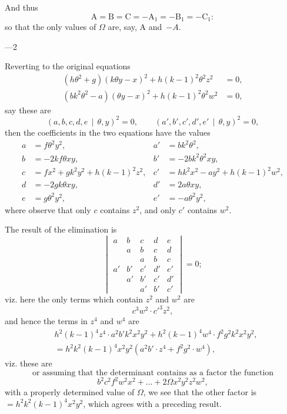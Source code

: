 \documentclass[12pt,a4paper]{article}
\theoremstyle{plain}
\begin{document}
And thus
\[
\text{A} = \text{B} = \text{C} = -\text{A}_{1} = -\text{B}_{1} = -\text{C}_{1}:
\]
so that the only values of $\Omega$ are, say, A and~$-A$.

\medskip{}---2

\newpage
\setcounter{page}{112}

Reverting to the original equations
\begin{align*}
(h\theta^{2} + g)(k\theta y - x)^{2} + h(k-1)^{2}\theta^{2}z^{2} &= 0, \\
(bk^{2}\theta^{2} - a)(\theta y - x)^{2} + h(k-1)^{2}\theta^{2}w^{2} &= 0,
\end{align*}
say these are
\[
(a, b, c, d, e\,\!\!\mid\,\theta, y)^{2} = 0, \qquad (a', b', c', d', e'\,\!\!\mid\,\theta, y)^{2} = 0,
\]
then the coefficients in the two equations have the values
\begin{align*}
a &= f\theta^{2}y^{2}, & a' &= bk^{2}\theta^{2}, \\
b &= -2kf\theta xy, & b' &= -2bk^{2}\theta^{2}xy, \\
c &= fx^{2} + gk^{2}y^{2} + h(k-1)^{2}z^{2}, & c' &= hk^{2}x^{2} - ay^{2} + h(k-1)^{2}w^{2}, \\
d &= -2gk\theta xy, & d' &= 2a\theta xy, \\
e &= g\theta^{2}y^{2}, & e' &= -a\theta^{2}y^{2},
\end{align*}
where observe that only $c$ contains $z^{2}$, and only $c'$ contains $w^{2}$.

The result of the elimination is
\[
\begin{vmatrix}
a & b & c & d & e \\
  & a & b & c & d \\
  &   & a & b & c \\
a' & b' & c' & d' & e' \\
   & a' & b' & c' & d' \\
   &    & a' & b' & c'
\end{vmatrix}
= 0;
\]
viz. here the only terms which contain $z^{2}$ and $w^{2}$ are
\[
c^{3}w^{2} \cdot c'^{3}z^{2},
\]
and hence the terms in $z^{4}$ and $w^{4}$ are
\begin{align*}
&h^{2}(k-1)^{4}z^{4} \cdot a^{2}b'k^{2}x^{2}y^{2} + h^{2}(k-1)^{4}w^{4} \cdot f^{2}g^{2}k^{2}x^{2}y^{2}, \\
&= h^{2}k^{2}(k-1)^{4}x^{2}y^{2}(a^{2}b' \cdot z^{4} + f^{2}g^{2} \cdot w^{4}),
\end{align*}
viz. these are
\[
\text{or assuming that the determinant contains as a factor the function}
\]
\[
b^{2}c^{2}f^{2}w^{2}x^{2} + \ldots + 2\Omega x^{2}y^{2}z^{2}w^{2},
\]
with a properly determined value of $\Omega$, we see that the other factor is $= h^{2}k^{2}(k-1)^{4}x^{2}y^{2}$, which agrees with a preceding result.
\end{document}
